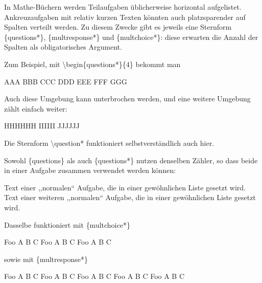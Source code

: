 \documentclass[hyperworksheet]{drcschool}
\newcommand*{\cs}[1]{\textup{\ttfamily\textbackslash#1}}                   %
\newcommand*{\env}[1]{\textup{\ttfamily\{#1\}}}                            %
\begin{document}

\begin{worksheet}

In Mathe-Büchern werden Teilaufgaben üblicherweise horizontal aufgelistet.
Ankreuzaufgaben mit relativ kurzen Texten könnten auch platzsparender auf
Spalten verteilt werden. Zu diesem Zwecke gibt es jeweils eine Sternform
\env{questions*}, \env{multresponse*} und \env{multchoice*}: diese erwarten
die Anzahl der Spalten als obligatorisches Argument.

Zum Beispiel, mit \cs{begin\{questions*\}\{4\}} bekommt man
\begin{questions*}{4}
\question AAA
\question* BBB
\question CCC
\question* DDD
\question EEE
\question FFF
\question GGG
\end{questions*}
Auch diese Umgebung kann unterbrochen werden, und eine weitere Umgebung
zählt einfach weiter:
\begin{questions*}{3}
\question HHHHHH
\question IIIIII
\question JJJJJJ
\end{questions*}
Die Sternform \cs{question*} funktioniert selbstverständlich auch hier.

Sowohl \env{questions} als auch \env{questions*} nutzen denselben Zähler, so
dass beide in einer Aufgabe zusammen verwendet werden können:
\begin{questions}
\question Text einer ,,normalen`` Aufgabe, die in einer gewöhnlichen Liste gesetzt wird.
\question Text einer weiteren ,,normalen`` Aufgabe, die in einer gewöhnlichen Liste gesetzt wird.
\end{questions}

\exercise[Ankreuzaufgaben]
Dasselbe funktioniert mit \env{multchoice*}
\begin{multchoice*}{3}
\question Foo
   \choice* A
   \choice B
   \choice C
\question Foo
   \choice A
   \choice B
   \choice* C
\question Foo
   \choice A
   \choice* B
   \choice C
\end{multchoice*}
sowie mit \env{multresponse*}
\begin{multresponse*}{3}
\question Foo
   \choice* A
   \choice B
   \choice* C
\question Foo
   \choice A
   \choice B
   \choice* C
\question Foo
   \choice* A
   \choice* B
   \choice C
\question Foo
   \choice A
   \choice* B
   \choice* C
\question Foo
   \choice A
   \choice* B
   \choice C
\end{multresponse*}


\end{worksheet}
\end{document}
